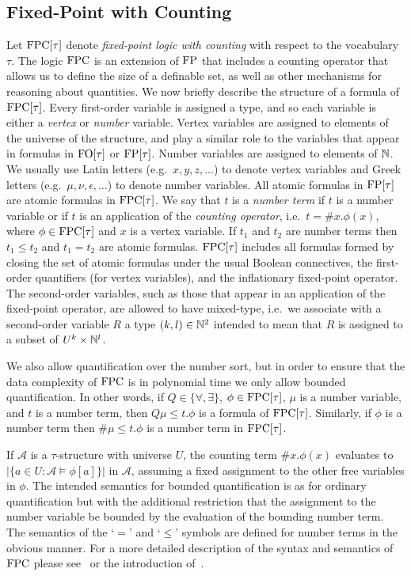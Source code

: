 \documentclass[../paper.tex]{subfiles}
\begin{document}
\subsection{Fixed-Point with Counting}
Let $\text{\upshape FPC}[\tau]$ denote \emph{fixed-point logic with counting} with respect to
the vocabulary $\tau$. The logic $\text{\upshape FPC}$ is an extension of $\text{\upshape FP}$ that includes a
counting operator that allows us to define the size of a definable set, as well
as other mechanisms for reasoning about quantities. We now briefly describe the
structure of a formula of $\text{\upshape FPC}[\tau]$. Every first-order variable is assigned a
type, and so each variable is either a \emph{vertex} or \emph{number} variable.
Vertex variables are assigned to elements of the universe of the structure, and
play a similar role to the variables that appear in formulas in $\text{\upshape FO}[\tau]$ or
$\text{\upshape FP}[\tau]$. Number variables are assigned to elements of $\mathbb{N}$. We usually
use Latin letters (e.g.\ $x, y, z, \ldots$) to denote vertex variables and Greek
letters (e.g.\ $\mu, \nu, \epsilon, \ldots$) to denote number variables. All
atomic formulas in $\text{\upshape FP}[\tau]$ are atomic formulas in $\text{\upshape FPC}[\tau]$. We say that
$t$ is a \emph{number term} if $t$ is a number variable or if $t$ is an application
of the \emph{counting operator}, i.e.\ $t = \#x. \phi(x)$, where $\phi \in
\text{\upshape FPC}[\tau]$ and $x$ is a vertex variable. If $t_1$ and $t_2$ are
number terms then $t_1 \leq t_2$ and $t_1 = t_2$ are atomic formulas.
$\text{\upshape FPC}[\tau]$ includes all formulas formed by closing the set of atomic formulas
under the usual Boolean connectives, the first-order quantifiers (for vertex
variables), and the inflationary fixed-point operator. The second-order
variables, such as those that appear in an application of the fixed-point
operator, are allowed to have mixed-type, i.e.\ we associate with a second-order
variable $R$ a type $(k, l) \in \mathbb{N}^2$ intended to mean that $R$ is assigned
to a subset of $U^k \times \mathbb{N}^l$.

We also allow quantification over the number sort, but in order to ensure that
the data complexity of $\text{\upshape FPC}$ is in polynomial time we only allow bounded
quantification. In other words, if $Q \in \{\forall, \exists \}$, $\phi \in
\text{\upshape FPC}[\tau]$, $\mu$ is a number variable, and $t$ is a number
term, then $Q \mu \leq t . \phi$ is a formula of $\text{\upshape FPC}[\tau]$. Similarly, if
$\phi$ is a number term then $\# \mu \leq t .\phi$ is a number term in
$\text{\upshape FPC}[\tau]$.

If $\mathcal{A}$ is a $\tau$-structure with universe $U$, the counting term
$\#x. \phi(x)$ evaluates to $\vert \{a \in U : \mathcal{A} \models \phi[a]\}
\vert$ in $\mathcal{A}$, assuming a fixed assignment to the other free variables
in $\phi$. The intended semantics for bounded quantification is as for ordinary
quantification but with the additional restriction that the assignment to the
number variable be bounded by the evaluation of the bounding number term. The
semantics of the `$=$' and `$\leq$' symbols are defined for number terms in the
obvious manner. For a more detailed description of the syntax and semantics of
$\text{\upshape FPC}$ please see~\cite{grohe2017descriptive} or the introduction
of~\cite{GradelP15a}.
\end{document}
